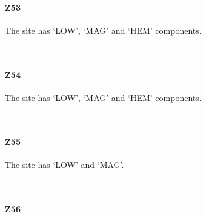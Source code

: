 \documentclass[11pt]{article}
\begin{document}
    \newpage
    
    \paragraph{Z53}\label{z53}

    The site has `LOW', `MAG' and `HEM' components.



    \begin{center}
    \end{center}
    { \hspace*{\fill} \\}
    
    \newpage
    
    \paragraph{Z54}\label{z54}

    The site has `LOW', `MAG' and `HEM' components.



    \begin{center}
    \end{center}
    { \hspace*{\fill} \\}
    
    \newpage
    
    \paragraph{Z55}\label{z55}

    The site has `LOW' and `MAG'.



    \begin{center}
    \end{center}
    { \hspace*{\fill} \\}
    
    \newpage
    
    \paragraph{Z56}\label{z56}
\end{document}
